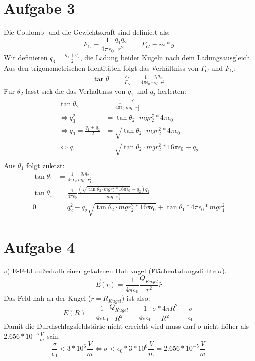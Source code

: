 \documentclass[a4paper]{article}
\newcommand{\kco}{\frac{1}{4\pi\epsilon_0}}
\begin{document}
\newpage
\setlength{\headheight}{0cm}
\section*{Aufgabe 3}
Die Coulomb- und die Gewichtskraft sind definiert als:
\[
	F_C = \kco \frac{q_1q_2}{r^2} \qquad F_G = m*g
\]
Wir definieren $q_3 = \frac{q_1 + q_2}{2} $, die Ladung  beider Kugeln nach dem Ladungsausgleich. Aus den trigonometrischen Identitäten folgt das Verhältniss von $F_C$ und $F_G$:
\begin{align*}
	\tan \theta &= \frac{F_C}{F_G} =  \kco \frac{q_1q_2}{mg \cdot r^2}
\end{align*}
Für $\theta_2$ lässt sich die das Verhältniss von $q_1$ und $q_2$ herleiten:
\begin{align*}
	\tan \theta_2 &= \kco \frac{q_3^2}{mg \cdot r_2^2} \\
	\Leftrightarrow
	q_3^2 &= \tan \theta_2 \cdot mg r_2^2 * 4\pi\epsilon_0 \\
	\Leftrightarrow
	q_3 = \frac{q_1 + q_2}{2} &= \sqrt{\tan \theta_2 \cdot mg r_2^2 * 4\pi\epsilon_0} \\
	\Leftrightarrow
	q_1 &= \sqrt{\tan \theta_2 \cdot mg r_2^2 * 16\pi\epsilon_0} - q_2 \\
\end{align*}
Aus $\theta_1$ folgt zuletzt:
\begin{align*}
	\tan \theta_1 &= \kco \frac{q_1q_2}{mg \cdot r_1^2} \\
	\tan \theta_1 &= \kco \frac{ \left( \sqrt{\tan \theta_2 \cdot mg r_2^2 * 16\pi\epsilon_0} - q_2 \right) q_2}{mg \cdot r_1^2} \\
	0 &= q_2^2 - q_2 \sqrt{\tan \theta_2 \cdot mg r_2^2 * 16\pi\epsilon_0}  + \tan \theta_1 * 4\pi\epsilon_0	*mg r_1^2 
\end{align*}


\section*{Aufgabe 4}
\par{a)}
E-Feld außerhalb einer geladenen Hohlkugel (Flächenladungsdichte $\sigma$):
\[ \vec E(r) = \kco \frac{Q_{Kugel}}{r^2} \hat r \]
Das Feld nah an der Kugel ($r = R_{Kugel}$) ist also:
\[
E(R) = \kco \frac{Q_{Kugel}}{R^2} = \kco \frac{\sigma * 4 \pi R^2}{R^2} = \frac \sigma {\epsilon_0}
\]
Damit die Durchschlagsfeldstärke nicht erreicht wird muss darf $\sigma$ nicht höher als $2.656 * 10^{-5} \frac V m$ sein:
\[
\frac \sigma {\epsilon_0} < 3 * 10^6 \frac V m
\Leftrightarrow
\sigma < \epsilon_0 * 3 * 10^6 \frac V m = 2.656 * 10^{-5} \frac V m
\]
\vspace{1cm}
\end{document}
